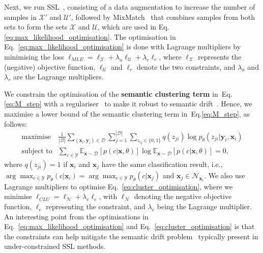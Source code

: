 \documentclass[review]{elsarticle}
\theoremstyle{plain}
\begin{document}
Next, we run SSL~\citep{li2020dividemix}, consisting of a data augmentation to increase the number of samples in $\mathcal{X}'$ and $\mathcal{U}'$, followed by 
MixMatch~\citep{MixMatch} 
that combines samples from both sets to form the sets $\mathcal{X}$ and $\mathcal{U}$, which are used in Eq.\ref{eq:max_likelihood_optimisation}. 
The optimisation in Eq.~\ref{eq:max_likelihood_optimisation} is done with Lagrange multipliers by minimising the loss $\ell_{MLE}= \ell_{\mathcal{X}} + \lambda_u\ell_{\mathcal{U}}  +
\lambda_r\ell_{r}$, where $\ell_{\mathcal{X}}$ represents the (negative) objective function, $\ell_{\mathcal{U}}$ and $\ell_{r}$ denote the two constraints, and $\lambda_u$ and $\lambda_r$ are the Lagrange multipliers.



We constrain the optimisation of the \textbf{semantic clustering term} in~Eq.\ref{eq:M_step} with a 
regulariser~\citep{SCAN} to make it robust to semantic drift~\citep{zhang2019addressing}.
Hence, we maximise a lower bound of 
the semantic clustering term in~Eq.\ref{eq:M_step}, as follows:
\begin{equation}
    \begin{split}
        \text{maximise} & \frac{1}{|\mathcal{D}|}  \sum_{(\mathbf{x}_i,\mathbf{y}_i) \in \mathcal{D}} 
   \sum_{j=1}^{|\mathcal{D}|} \sum_{z_{ij}\in \{0,1\}} q(z_{ji})\log p_{\theta}(z_{ji}|\mathbf{y}_i,\mathbf{x}_i) \\
        \text{subject to} & \sum_{c \in \mathcal{Y}} \mathbb{E}_{\mathbf{x}\sim \mathcal{D}}[p(c|\mathbf{x},\theta)] \log \mathbb{E}_{\mathbf{x}\sim \mathcal{D}}[p(c|\mathbf{x},\theta)]=0,
    \end{split}
    \label{eq:cluster_optimisation}
\end{equation}
where $q(z_{ji}) = 1$ if $\mathbf{x}_i$ and $\mathbf{x}_j$ have the same classification result, i.e.,
$\arg\max_{c \in \mathcal{Y}}p_{\theta}(c | \mathbf{x}_i)=\arg\max_{c \in \mathcal{Y}}p_{\theta}(c | \mathbf{x}_j)$ and $\mathbf{x}_j \in \mathcal{N}_{\mathbf{x}_i}$.
We also use Lagrange multipliers to optimise Eq.~\ref{eq:cluster_optimisation}, where we minimise $\ell_{CLU}= \ell_{\mathcal{N}} + \lambda_e\ell_{e}$, with $\ell_{\mathcal{N}}$ denoting the negative objective function, $\ell_{e}$ representing the constraint, and $\lambda_e$ being the Lagrange multiplier. An interesting point from the optimisations in Eq.~\ref{eq:max_likelihood_optimisation}
and Eq.~\ref{eq:cluster_optimisation} is that the constraints can help mitigate the semantic drift problem~\citep{zhang2019addressing} typically present in under-constrained SSL methods. 
\end{document}
